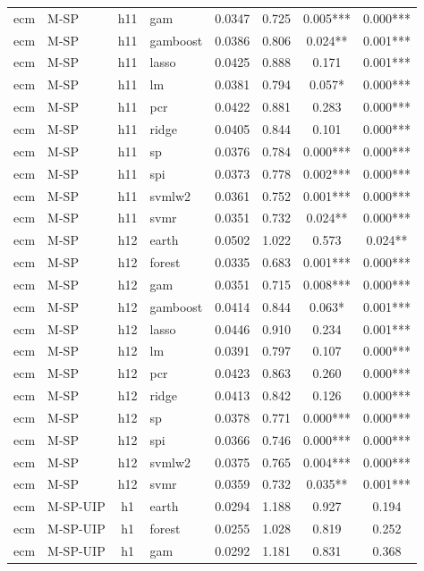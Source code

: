 \begin{ThreePartTable}
\begin{longtable}[t]{llclcccc}
ecm & M-SP & h11 & gam & 0.0347 & 0.725 & 0.005*** & 0.000***\\
ecm & M-SP & h11 & gamboost & 0.0386 & 0.806 & 0.024** & 0.001***\\
ecm & M-SP & h11 & lasso & 0.0425 & 0.888 & 0.171 & 0.001***\\
ecm & M-SP & h11 & lm & 0.0381 & 0.794 & 0.057* & 0.000***\\
ecm & M-SP & h11 & pcr & 0.0422 & 0.881 & 0.283 & 0.000***\\
ecm & M-SP & h11 & ridge & 0.0405 & 0.844 & 0.101 & 0.000***\\
ecm & M-SP & h11 & sp & 0.0376 & 0.784 & 0.000*** & 0.000***\\
ecm & M-SP & h11 & spi & 0.0373 & 0.778 & 0.002*** & 0.000***\\
ecm & M-SP & h11 & svmlw2 & 0.0361 & 0.752 & 0.001*** & 0.000***\\
ecm & M-SP & h11 & svmr & 0.0351 & 0.732 & 0.024** & 0.000***\\
\addlinespace
ecm & M-SP & h12 & earth & 0.0502 & 1.022 & 0.573 & 0.024**\\
ecm & M-SP & h12 & forest & 0.0335 & 0.683 & 0.001*** & 0.000***\\
ecm & M-SP & h12 & gam & 0.0351 & 0.715 & 0.008*** & 0.000***\\
ecm & M-SP & h12 & gamboost & 0.0414 & 0.844 & 0.063* & 0.001***\\
ecm & M-SP & h12 & lasso & 0.0446 & 0.910 & 0.234 & 0.001***\\
ecm & M-SP & h12 & lm & 0.0391 & 0.797 & 0.107 & 0.000***\\
ecm & M-SP & h12 & pcr & 0.0423 & 0.863 & 0.260 & 0.000***\\
ecm & M-SP & h12 & ridge & 0.0413 & 0.842 & 0.126 & 0.000***\\
ecm & M-SP & h12 & sp & 0.0378 & 0.771 & 0.000*** & 0.000***\\
ecm & M-SP & h12 & spi & 0.0366 & 0.746 & 0.000*** & 0.000***\\
ecm & M-SP & h12 & svmlw2 & 0.0375 & 0.765 & 0.004*** & 0.000***\\
ecm & M-SP & h12 & svmr & 0.0359 & 0.732 & 0.035** & 0.001***\\
\addlinespace
ecm & M-SP-UIP & h1 & earth & 0.0294 & 1.188 & 0.927 & 0.194\\
ecm & M-SP-UIP & h1 & forest & 0.0255 & 1.028 & 0.819 & 0.252\\
ecm & M-SP-UIP & h1 & gam & 0.0292 & 1.181 & 0.831 & 0.368\\

\end{longtable}
\end{ThreePartTable}
